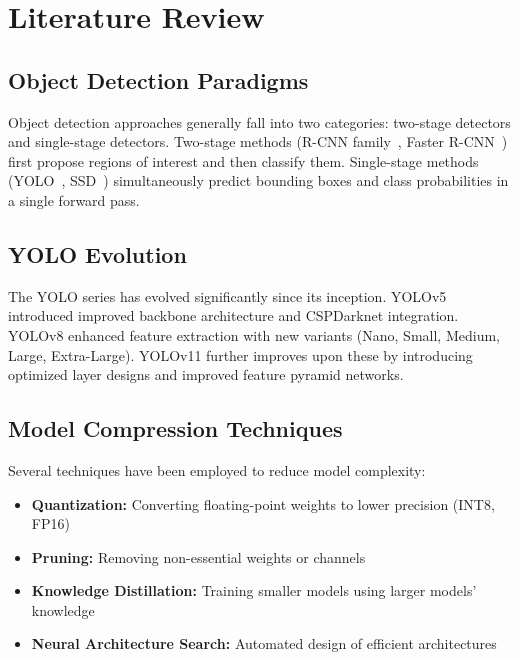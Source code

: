 \documentclass[11pt,a4paper]{article}
\begin{document}

\section{Literature Review}
\label{sec:litrev}

\subsection{Object Detection Paradigms}

Object detection approaches generally fall into two categories: two-stage detectors and single-stage detectors. 
Two-stage methods (R-CNN family~\cite{ref1}, Faster R-CNN~\cite{ref2}) first propose regions of interest 
and then classify them. Single-stage methods (YOLO~\cite{ref3}, SSD~\cite{ref4}) simultaneously predict 
bounding boxes and class probabilities in a single forward pass.

\subsection{YOLO Evolution}

The YOLO series has evolved significantly since its inception. YOLOv5 introduced improved backbone architecture 
and CSPDarknet integration. YOLOv8 enhanced feature extraction with new variants (Nano, Small, Medium, Large, Extra-Large). 
YOLOv11 further improves upon these by introducing optimized layer designs and improved feature pyramid networks.

\subsection{Model Compression Techniques}

Several techniques have been employed to reduce model complexity:
\begin{itemize}
    \item \textbf{Quantization:} Converting floating-point weights to lower precision (INT8, FP16)~\cite{ref5}
    \item \textbf{Pruning:} Removing non-essential weights or channels~\cite{ref6}
    \item \textbf{Knowledge Distillation:} Training smaller models using larger models' knowledge~\cite{ref7}
    \item \textbf{Neural Architecture Search:} Automated design of efficient architectures~\cite{ref8}
\end{itemize}
\end{document}
